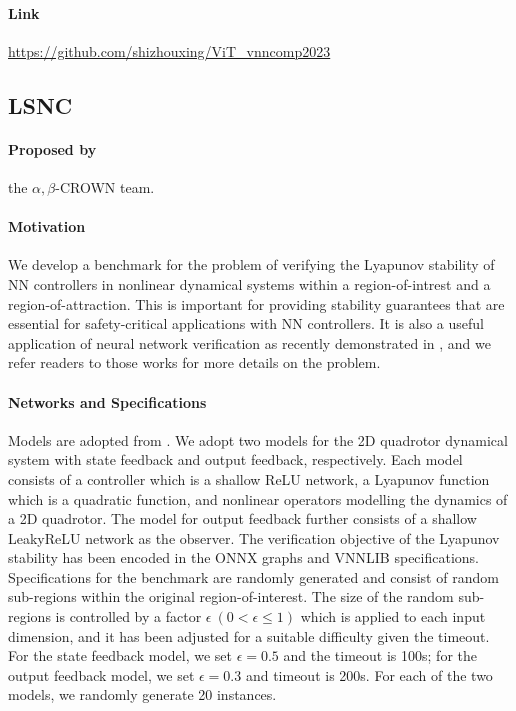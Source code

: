 \documentclass[oneside,11pt,dvipsnames]{book}
\begin{document}
\paragraph*{Link} \url{https://github.com/shizhouxing/ViT_vnncomp2023}


\subsection{LSNC}

\paragraph*{Proposed by} the $\alpha,\!\beta$-CROWN team.
\paragraph*{Motivation}
We develop a benchmark for the problem of verifying the Lyapunov stability of NN controllers in nonlinear dynamical systems within a region-of-intrest and a region-of-attraction. This is important for providing stability guarantees that are essential for safety-critical applications with NN controllers. It is also a useful application of neural network verification as recently demonstrated in \cite{yang2024lyapunov,shi2024certified}, and we refer readers to those works for more details on the problem.
\paragraph*{Networks and Specifications}
Models are adopted from \cite{yang2024lyapunov}. 
We adopt two models for the 2D quadrotor dynamical system with state feedback and output feedback, respectively. Each model consists of a controller which is a shallow ReLU network, a Lyapunov function which is a quadratic function, and nonlinear operators modelling the dynamics of a 2D quadrotor. The model for output feedback further consists of a shallow LeakyReLU network as the observer. The verification objective of the Lyapunov stability has been encoded in the ONNX graphs and VNNLIB specifications. Specifications for the benchmark are randomly generated and consist of random sub-regions within the original region-of-interest. The size of the random sub-regions is controlled by a factor $\epsilon~(0<\epsilon\leq 1)$ which is applied to each input dimension, and it has been adjusted for a suitable difficulty given the timeout. For the state feedback model, we set $\epsilon=0.5$ and the timeout is 100s; for the output feedback model, we set $\epsilon=0.3$ and timeout is 200s. For each of the two models, we randomly generate 20 instances. 
\end{document}
